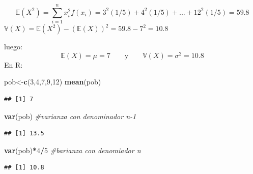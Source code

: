 \documentclass[
  ignorenonframetext,
]{beamer}
\newenvironment{Shaded}{\begin{snugshade}}{\end{snugshade}}
\newcommand{\CommentTok}[1]{\textcolor[rgb]{0.56,0.35,0.01}{\textit{#1}}}
\newcommand{\DecValTok}[1]{\textcolor[rgb]{0.00,0.00,0.81}{#1}}
\newcommand{\KeywordTok}[1]{\textcolor[rgb]{0.13,0.29,0.53}{\textbf{#1}}}
\newcommand{\NormalTok}[1]{#1}
\newcommand{\OperatorTok}[1]{\textcolor[rgb]{0.81,0.36,0.00}{\textbf{#1}}}
\begin{document}
\begin{frame}[fragile]{}

\[\mathbb{E}(X^2)=\sum_{i=1}^{n} x_i^2f(x_i)=3^2(1/5)+4^2(1/5)+...+12^2(1/5)=59.8\]
\(\mathbb{V}(X)= \mathbb{E}(X^2)-(\mathbb{E}(X))^2=59.8-7^2=10.8\)

luego:
\[\mathbb{E}(X)=\mu=7 \quad\quad \mbox{y} \quad\quad  \mathbb{V}(X)=\sigma^2=10.8 \]
En R:

\begin{Shaded}
\begin{Highlighting}[]
\NormalTok{pob<-}\KeywordTok{c}\NormalTok{(}\DecValTok{3}\NormalTok{,}\DecValTok{4}\NormalTok{,}\DecValTok{7}\NormalTok{,}\DecValTok{9}\NormalTok{,}\DecValTok{12}\NormalTok{)}
\KeywordTok{mean}\NormalTok{(pob)}
\end{Highlighting}
\end{Shaded}

\begin{verbatim}
## [1] 7
\end{verbatim}

\begin{Shaded}
\begin{Highlighting}[]
\KeywordTok{var}\NormalTok{(pob) }\CommentTok{#varianza con denominador n-1}
\end{Highlighting}
\end{Shaded}

\begin{verbatim}
## [1] 13.5
\end{verbatim}

\begin{Shaded}
\begin{Highlighting}[]
\KeywordTok{var}\NormalTok{(pob)}\OperatorTok{*}\DecValTok{4}\OperatorTok{/}\DecValTok{5} \CommentTok{#barianza con denomiador n}
\end{Highlighting}
\end{Shaded}

\begin{verbatim}
## [1] 10.8
\end{verbatim}

\end{frame}

\hypertarget{section-5}{%
\subsection{}\label{section-5}}
\end{document}
